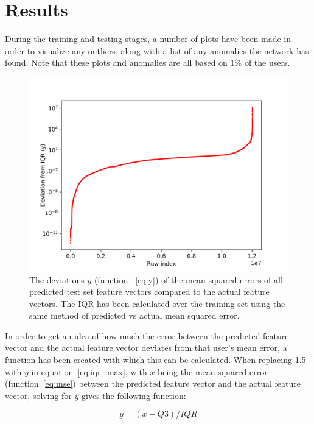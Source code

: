 \chapter{Results}\label{ch:results}

During the training and testing stages, a number of plots have been made in order to visualize any outliers, along with a list of any anomalies the network has found. Note that these plots and anomalies are all based on 1\% of the users.

\begin{figure}
	\begin{center}
		\includegraphics[scale=0.1]{results/all_deviations}
	\end{center}
	\caption{The deviations \(y\) (function ~\ref{eq:y}) of the mean squared errors of all predicted test set feature vectors compared to the actual feature vectors. The IQR has been calculated over the training set using the same method of predicted vs actual mean squared error.~\label{fig:iqr_scale}}
\end{figure}

In order to get an idea of how much the error between the predicted feature vector and the actual feature vector deviates from that user's mean error, a function has been created with which this can be calculated. When replacing 1.5 with \(y\) in equation~\ref{eq:iqr_max}, with \(x\) being the mean squared error (function~\ref{eq:mse}) between the predicted feature vector and the actual feature vector, solving for \(y\) gives the following function:

\begin{equation} \label{eq:y}
y = (x - Q3) / IQR
\end{equation}

